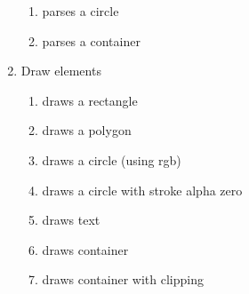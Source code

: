 \begin{enumerate}[label={T\arabic*}]
\begin{enumerate}[label={T\arabic{enumi}.\arabic*}]
		\item \label{test:js:parse:circle} parses a circle
		\item \label{test:js:parse:container} parses a container
	\end{enumerate}
	\item Draw elements
	\begin{enumerate}[label={T\arabic{enumi}.\arabic*}]
		\item \label{test:js:draw:rect} draws a rectangle
		\item \label{test:js:draw:polygon} draws a polygon
		\item \label{test:js:draw:circle} draws a circle (using rgb)
		\item \label{test:js:draw:circle:alpha} draws a circle with stroke alpha zero
		\item \label{test:js:draw:text} draws text
		\item \label{test:js:draw:container} draws container
		\item \label{test:js:draw:container:clipping} draws container with clipping
	\end{enumerate}


\end{enumerate}
